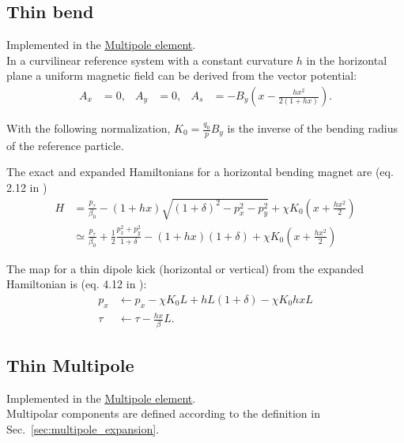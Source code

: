 \subsection{Thin bend}

Implemented in the \href{https://xsuite.readthedocs.io/en/latest/apireference.html#multipole}{\underline{Multipole element}}.
~\\

In a curvilinear reference system with a constant curvature $h$ in the
horizontal plane a uniform magnetic field can be derived from the vector potential:
\begin{align}
  A_x & = 0, & A_y & = 0, & A_s & =
  - B_y \left(x-\frac{h x^2}{2 (1+h x)}\right).
\end{align}

With the following normalization, $K_0=\frac{q_0}{p} B_y$ is the inverse of the bending
radius of the reference particle.

The exact and expanded Hamiltonians for a horizontal bending magnet are (eq. 2.12 in
\cite{barber87})
\begin{align}
  H &= \frac{p_\tau}{\beta_0}
       - (1+h x)\sqrt{(1+\delta)^2 -p_x^2 - p_y^2}
       + \chi K_0 \left( x + \frac{h x^2}{2} \right)  \\
    &\simeq   \frac{p_\tau}{\beta_0}
    + \frac{1}{2}\frac{p_x^2+p_y^2}{1+\delta}
  - (1+h x) (1+\delta) + \chi K_0 \left( x + \frac{h x^2}{2} \right)
\end{align}


The map for a thin dipole kick (horizontal or vertical) from the expanded Hamiltonian is
(eq. 4.12 in \cite{heinemann95}):
\begin{align}
  p_x &\leftarrow p_x - \chi K_0 L + h L (1 + \delta)  - \chi K_0  h x L\\
  \tau &\leftarrow \tau - \frac{h x}{\beta}  L.
\end{align}



\subsection{Thin Multipole}

Implemented in the \href{https://xsuite.readthedocs.io/en/latest/apireference.html#multipole}{\underline{Multipole element}}.
~\\

Multipolar components are defined according to the definition in Sec.~\ref{sec:multipole_expansion}.


